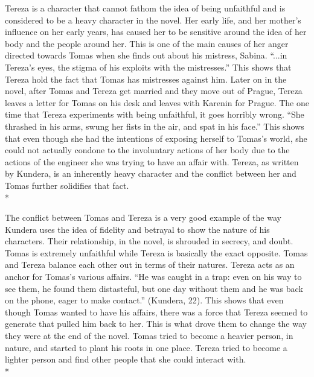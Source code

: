 \documentclass[12pt, letterpaper]{report}
\begin{document}
    Tereza is a character that cannot fathom the idea of being unfaithful and is considered to be a heavy character in the novel. Her early life, and her mother’s influence on her early years, has caused her to be sensitive around the idea of her body and the people around her. This is one of the main causes of her anger directed towards Tomas when she finds out about his mistress, Sabina. “...in Tereza’s eyes, the stigma of his exploits with the mistresses.” This shows that Tereza hold the fact that Tomas has mistresses against him. Later on in the novel, after Tomas and Tereza get married and they move out of Prague, Tereza leaves a letter for Tomas on his desk and leaves with Karenin for Prague. The one time that Tereza experiments with being unfaithful, it goes horribly wrong. “She thrashed in his arms, swung her fists in the air, and spat in his face.” This shows that even though she had the intentions of exposing herself to Tomas’s world, she could not actually condone to the involuntary actions of her body due to the actions of the engineer she was trying to have an affair with. Tereza, as written by Kundera, is an inherently heavy character and the conflict between her and Tomas further solidifies that fact.\\*
    
    The conflict between Tomas and Tereza is a very good example of the way Kundera uses the idea of fidelity and betrayal to show the nature of his characters. Their relationship, in the novel, is shrouded in secrecy, and doubt. Tomas is extremely unfaithful while Tereza is basically the exact opposite. Tomas and Tereza balance each other out in terms of their natures. Tereza acts as an anchor for Tomas’s various affairs. “He was caught in a trap: even on his way to see them, he found them distasteful, but one day without them and he was back on the phone, eager to make contact.” (Kundera, 22). This shows that even though Tomas wanted to have his affairs, there was a force that Tereza seemed to generate that pulled him back to her. This is what drove them to change the way they were at the end of the novel. Tomas tried to become a heavier person, in nature, and started to plant his roots in one place. Tereza tried to become a lighter person and find other people that she could interact with.\\*
    
\end{document}
